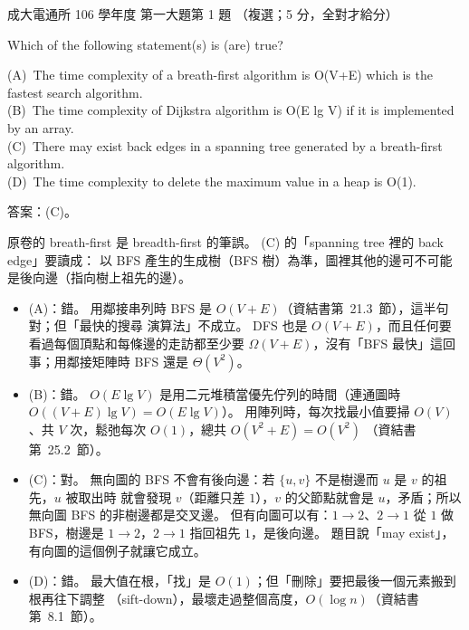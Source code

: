 \begin{pastexam}[label={px:ncku-106-cce-ds-01}]{成大電通所 106 學年度 第一大題第 1 題}
（複選；5 分，全對才給分）

Which of the following statement(s) is (are) true?

(A)~The time complexity of a breath-first algorithm is O(V+E) which is the fastest search
algorithm.\\
(B)~The time complexity of Dijkstra algorithm is O(E lg V) if it is implemented by an array.\\
(C)~There may exist back edges in a spanning tree generated by a breath-first algorithm.\\
(D)~The time complexity to delete the maximum value in a heap is O(1).
\end{pastexam}

\begin{pastsoln}
答案：(C)。

原卷的 breath-first 是 breadth-first 的筆誤。 (C) 的「spanning tree 裡的 back edge」要讀成：
以 BFS 產生的生成樹（BFS 樹）為準，圖裡其他的邊可不可能是後向邊（指向樹上祖先的邊）。

\begin{itemize}
\item (A)：錯。 用鄰接串列時 BFS 是 $O(V + E)$（資結書第~21.3~節），這半句對；但「最快的搜尋
演算法」不成立。 DFS 也是 $O(V + E)$，而且任何要看過每個頂點和每條邊的走訪都至少要
$\Omega(V + E)$，沒有「BFS 最快」這回事；用鄰接矩陣時 BFS 還是 $\Theta(V^2)$。
\item (B)：錯。 $O(E \lg V)$ 是用二元堆積當優先佇列的時間（連通圖時 $O((V + E) \lg V) = O(E \lg V)$）。
用陣列時，每次找最小值要掃 $O(V)$、共 $V$ 次，鬆弛每次 $O(1)$，總共 $O(V^2 + E) = O(V^2)$
（資結書第~25.2~節）。
\item (C)：對。 無向圖的 BFS 不會有後向邊：若 $\{u, v\}$ 不是樹邊而 $u$ 是 $v$ 的祖先，$u$ 被取出時
就會發現 $v$（距離只差 $1$），$v$ 的父節點就會是 $u$，矛盾；所以無向圖 BFS 的非樹邊都是交叉邊。
但有向圖可以有：$1 \to 2$、$2 \to 1$ 從 $1$ 做 BFS，樹邊是 $1 \to 2$，$2 \to 1$ 指回祖先 $1$，是後向邊。
題目說「may exist」，有向圖的這個例子就讓它成立。
\item (D)：錯。 最大值在根，「找」是 $O(1)$；但「刪除」要把最後一個元素搬到根再往下調整
（sift-down），最壞走過整個高度，$O(\log n)$（資結書第~8.1~節）。
\end{itemize}
\end{pastsoln}
